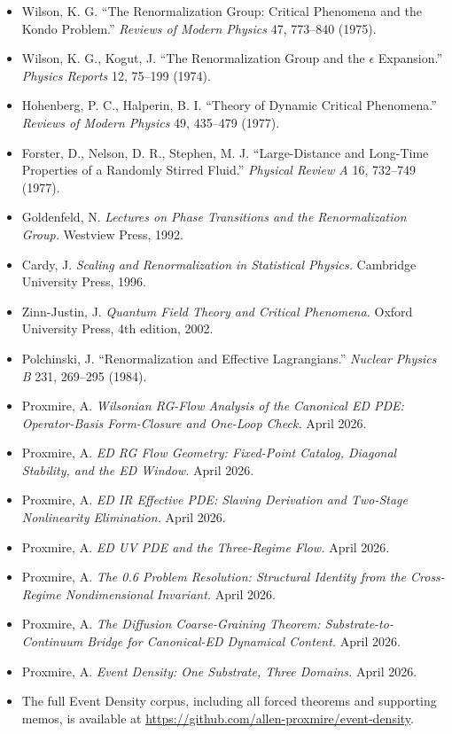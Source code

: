 \documentclass[11pt,a4paper]{article}
\begin{document}
\begin{itemize}[noitemsep]
\item Wilson, K. G. ``The Renormalization Group: Critical Phenomena and the Kondo Problem.'' \textit{Reviews of Modern Physics} 47, 773--840 (1975).
\item Wilson, K. G., Kogut, J. ``The Renormalization Group and the $\epsilon$ Expansion.'' \textit{Physics Reports} 12, 75--199 (1974).
\item Hohenberg, P. C., Halperin, B. I. ``Theory of Dynamic Critical Phenomena.'' \textit{Reviews of Modern Physics} 49, 435--479 (1977).
\item Forster, D., Nelson, D. R., Stephen, M. J. ``Large-Distance and Long-Time Properties of a Randomly Stirred Fluid.'' \textit{Physical Review A} 16, 732--749 (1977).
\item Goldenfeld, N. \textit{Lectures on Phase Transitions and the Renormalization Group.} Westview Press, 1992.
\item Cardy, J. \textit{Scaling and Renormalization in Statistical Physics.} Cambridge University Press, 1996.
\item Zinn-Justin, J. \textit{Quantum Field Theory and Critical Phenomena.} Oxford University Press, 4th edition, 2002.
\item Polchinski, J. ``Renormalization and Effective Lagrangians.'' \textit{Nuclear Physics B} 231, 269--295 (1984).
\item Proxmire, A. \textit{Wilsonian RG-Flow Analysis of the Canonical ED PDE: Operator-Basis Form-Closure and One-Loop Check.} April 2026.
\item Proxmire, A. \textit{ED RG Flow Geometry: Fixed-Point Catalog, Diagonal Stability, and the ED Window.} April 2026.
\item Proxmire, A. \textit{ED IR Effective PDE: Slaving Derivation and Two-Stage Nonlinearity Elimination.} April 2026.
\item Proxmire, A. \textit{ED UV PDE and the Three-Regime Flow.} April 2026.
\item Proxmire, A. \textit{The 0.6 Problem Resolution: Structural Identity from the Cross-Regime Nondimensional Invariant.} April 2026.
\item Proxmire, A. \textit{The Diffusion Coarse-Graining Theorem: Substrate-to-Continuum Bridge for Canonical-ED Dynamical Content.} April 2026.
\item Proxmire, A. \textit{Event Density: One Substrate, Three Domains.} April 2026.
\item The full Event Density corpus, including all forced theorems and supporting memos, is available at \url{https://github.com/allen-proxmire/event-density}.
\end{itemize}
\end{document}
